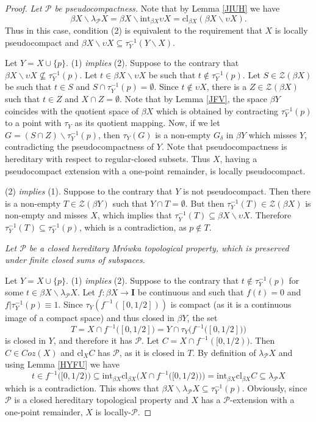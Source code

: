 \documentclass{amsart}
\theoremstyle{definition}
\theoremstyle{remark}
\theoremstyle{notation}
\numberwithin{equation}{section}
\begin{document}
\begin{proof}
{\em Let ${\mathcal P}$ be  pseudocompactness.} Note that by Lemma \ref{JIUH} we have
\[\beta X\backslash\lambda_{{\mathcal P}} X=\beta X\backslash\mbox{int}_{\beta X}\upsilon X=\mbox{cl}_{\beta X}(\beta X\backslash\upsilon X).\]
Thus in this case, condition  (2) is equivalent to the requirement that $X$ is locally pseudocompact and
$\beta X\backslash\upsilon X\subseteq\tau^{-1}_Y(Y\backslash X)$.

Let $Y=X\cup\{p\}$. (1) {\em  implies} (2). Suppose to the contrary that $\beta X\backslash\upsilon X\nsubseteq\tau^{-1}_Y(p)$.
Let $t\in \beta X\backslash\upsilon X$ be such that $t\notin \tau^{-1}_Y(p)$. Let $S\in {\mathscr Z}(\beta X)$ be such that $t\in S$ and
$S\cap \tau^{-1}_Y(p)=\emptyset$. Since $t\notin \upsilon X$, there is a  $Z\in{\mathscr Z}(\beta X)$ such that $t\in Z$ and $X\cap Z=\emptyset$.
Note that by Lemma \ref{JFV}, the space $\beta Y$ coincides with the quotient space of $\beta X$ which is obtained by contracting $\tau^{-1}_Y(p)$ to a point with $\tau_Y$ as its quotient mapping.  Now, if we let $G=(S\cap Z)\backslash\tau^{-1}_Y(p)$, then $\tau_Y(G)$ is a non-empty $G_\delta$ in  $\beta Y$ which misses $Y$, contradicting the pseudocompactness of $Y$. Note that pseudocompactness is hereditary with respect to regular-closed subsets. Thus $X$, having a pseudocompact extension with a one-point remainder, is locally pseudocompact.

(2) {\em  implies} (1).   Suppose to the contrary that $Y$ is not pseudocompact. Then there is a non-empty
$T\in {\mathscr Z}(\beta Y)$ such that $Y\cap T=\emptyset$. But then $\tau^{-1}_Y(T)\in  {\mathscr Z}(\beta X)$ is non-empty and misses $X$, which implies that $\tau^{-1}_Y(T)\subseteq\beta X\backslash\upsilon X$. Therefore $\tau^{-1}_Y(T)\subseteq \tau^{-1}_Y(p)$,  which is a contradiction,
as $p\notin T$.

{\em Let ${\mathcal P}$ be a closed hereditary Mr\'{o}wka topological property, which is preserved under finite closed sums of subspaces.}

Let $Y=X\cup\{p\}$. (1) {\em  implies} (2).
Suppose to the contrary that  $t\notin \tau^{-1}_Y(p)$ for some $t\in \beta X\backslash\lambda_{{\mathcal P}} X$.  Let $f:\beta X\rightarrow \mathbf{I}$
be continuous and such that $f(t)=0$ and $f|\tau^{-1}_Y(p)\equiv 1$. Since  $\tau_Y(f^{-1}([0,1/2]))$ is compact (as it is a continuous image of a compact space) and thus closed in $\beta Y$, the set
\[T=X\cap f^{-1}\big([0,1/2]\big)=Y\cap\tau_Y\big(f^{-1}\big([0,1/2]\big)\big)\]
is closed in $Y$, and therefore it has ${\mathcal P}$. Let $C=X\cap f^{-1}([0,1/2))$. Then $C\in Coz(X)$ and $\mbox{cl}_X C$ has ${\mathcal P}$, as it is  closed in $T$.
By definition of $\lambda_{{\mathcal P}} X$ and using Lemma \ref{HYFU} we have
\[t\in f^{-1}\big([0,1/2)\big)\subseteq\mbox{int}_{\beta X}\mbox{cl}_{\beta X}\big(X\cap f^{-1}\big([0,1/2)\big)\big)=\mbox{int}_{\beta X}\mbox{cl}_{\beta X}C\subseteq\lambda_{{\mathcal P}} X\]
which is a contradiction. This shows that  $\beta X\backslash\lambda_{{\mathcal P}} X\subseteq\tau^{-1}_Y(p)$.
Obviously, since ${\mathcal P}$ is a  closed hereditary topological property and $X$ has a ${\mathcal P}$-extension with a one-point remainder, $X$
is  locally-${\mathcal P}$.


\end{proof}
\end{document}
